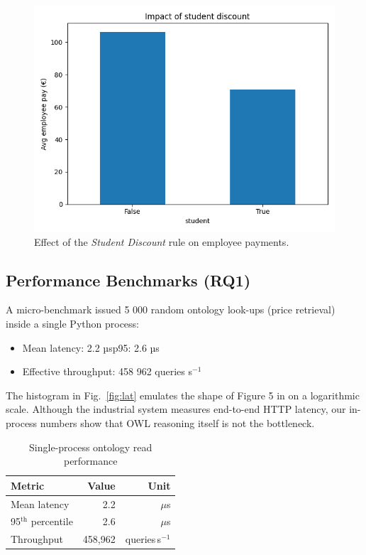 \documentclass[lettersize,journal]{IEEEtran}
\begin{document}
\begin{figure}[!t]
\centering
\includegraphics[width=.9\linewidth]{figs/kpi_student.png}
\caption{Effect of the \emph{Student Discount} rule on employee payments.}
\label{fig:kpi}
\end{figure}

\subsection{Performance Benchmarks (\textbf{RQ1})}
A micro-benchmark issued 5 000 random ontology look-ups (price retrieval) inside a single Python process:

\begin{itemize}
\item Mean latency: 2.2 µs\;p95: 2.6 µs
\item Effective throughput: 458 962 queries s$^{-1}$
\end{itemize}

The histogram in Fig.~\ref{fig:lat} emulates the shape of Figure 5 in \cite{ruleml24} on a logarithmic scale.  
Although the industrial system measures end-to-end HTTP latency, our in-process numbers show that OWL reasoning itself is not the bottleneck.

\begin{table}[b]
\centering
\caption{Single-process ontology read performance}
\label{tab:perf}
\begin{tabular}{lrr}
\hline
Metric & Value & Unit\\
\hline
Mean latency & 2.2 & $\mu$s\\
95$^{\text{th}}$ percentile & 2.6 & $\mu$s\\
Throughput & 458{,}962 & queries\,s$^{-1}$\\
\hline
\end{tabular}
\end{table}
\end{document}
